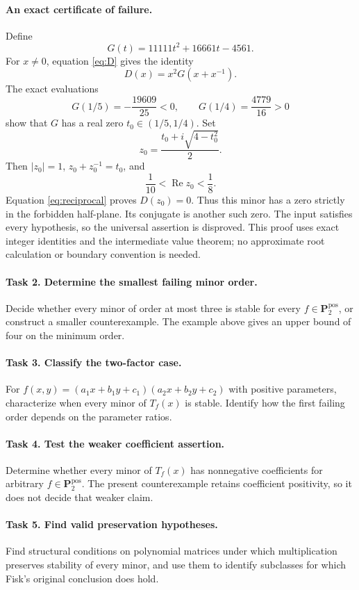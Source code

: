 \documentclass[11pt]{article}
\begin{document}
\paragraph{An exact certificate of failure.}
Define
\[
 G(t)=11111t^2+16661t-4561.
\]
For \(x\ne0\), equation \eqref{eq:D} gives the identity
\begin{equation}\label{eq:reciprocal}
 D(x)=x^2G(x+x^{-1}).
\end{equation}
The exact evaluations
\[
 G(1/5)=-\frac{19609}{25}<0,\qquad
 G(1/4)=\frac{4779}{16}>0
\]
show that \(G\) has a real zero \(t_0\in(1/5,1/4)\).
Set
\[
 z_0=\frac{t_0+i\sqrt{4-t_0^2}}2.
\]
Then \(|z_0|=1\), \(z_0+z_0^{-1}=t_0\), and
\[
 \frac1{10}<\operatorname{Re}z_0<\frac18.
\]
Equation \eqref{eq:reciprocal} proves \(D(z_0)=0\).
Thus this minor has a zero strictly in the forbidden half-plane.
Its conjugate is another such zero. The input satisfies every hypothesis,
so the universal assertion is disproved. This proof uses exact integer
identities and the intermediate value theorem; no approximate root
calculation or boundary convention is needed.

\paragraph{Task 2. Determine the smallest failing minor order.}
Decide whether every minor of order at most three is stable for every
\(f\in\mathbf P^{\mathrm{pos}}_2\), or construct a smaller counterexample.
The example above gives an upper bound of four on the minimum order.

\paragraph{Task 3. Classify the two-factor case.}
For \(f(x,y)=(a_1x+b_1y+c_1)(a_2x+b_2y+c_2)\) with positive parameters,
characterize when every minor of \(T_f(x)\) is stable. Identify how the
first failing order depends on the parameter ratios.

\paragraph{Task 4. Test the weaker coefficient assertion.}
Determine whether every minor of \(T_f(x)\) has nonnegative coefficients
for arbitrary \(f\in\mathbf P^{\mathrm{pos}}_2\). The present counterexample
retains coefficient positivity, so it does not decide that weaker claim.

\paragraph{Task 5. Find valid preservation hypotheses.}
Find structural conditions on polynomial matrices under which
multiplication preserves stability of every minor, and use them to
identify subclasses for which Fisk's original conclusion does hold.
\end{document}
